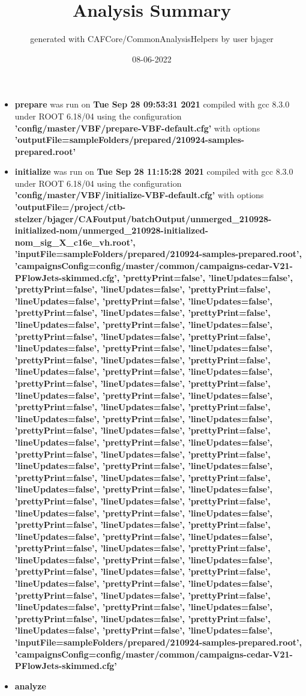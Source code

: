 \documentclass{article}
\title{Analysis Summary}
\author{generated with CAFCore/CommonAnalysisHelpers by user bjager}
\date{08-06-2022}
\begin{document}
\maketitle
\tableofcontents

\begin{itemize}
\item \textbf{prepare} was run on \textbf{Tue Sep 28 09:53:31 2021} compiled with gcc 8.3.0 under ROOT 6.18/04 using the configuration \textbf{'config/master/VBF/prepare-VBF-default.cfg'} with options \textbf{'outputFile=sampleFolders/prepared/210924-samples-prepared.root'} \item \textbf{initialize} was run on \textbf{Tue Sep 28 11:15:28 2021} compiled with gcc 8.3.0 under ROOT 6.18/04 using the configuration \textbf{'config/master/VBF/initialize-VBF-default.cfg'} with options \textbf{'outputFile=/project/ctb-stelzer/bjager/CAFoutput/batchOutput/unmerged\_210928-initialized-nom/unmerged\_210928-initialized-nom\_sig\_X\_c16e\_vh.root', 'inputFile=sampleFolders/prepared/210924-samples-prepared.root', 'campaignsConfig=config/master/common/campaigns-cedar-V21-PFlowJets-skimmed.cfg', 'prettyPrint=false', 'lineUpdates=false', 'prettyPrint=false', 'lineUpdates=false', 'prettyPrint=false', 'lineUpdates=false', 'prettyPrint=false', 'lineUpdates=false', 'prettyPrint=false', 'lineUpdates=false', 'prettyPrint=false', 'lineUpdates=false', 'prettyPrint=false', 'lineUpdates=false', 'prettyPrint=false', 'lineUpdates=false', 'prettyPrint=false', 'lineUpdates=false', 'prettyPrint=false', 'lineUpdates=false', 'prettyPrint=false', 'lineUpdates=false', 'prettyPrint=false', 'lineUpdates=false', 'prettyPrint=false', 'lineUpdates=false', 'prettyPrint=false', 'lineUpdates=false', 'prettyPrint=false', 'lineUpdates=false', 'prettyPrint=false', 'lineUpdates=false', 'prettyPrint=false', 'lineUpdates=false', 'prettyPrint=false', 'lineUpdates=false', 'prettyPrint=false', 'lineUpdates=false', 'prettyPrint=false', 'lineUpdates=false', 'prettyPrint=false', 'lineUpdates=false', 'prettyPrint=false', 'lineUpdates=false', 'prettyPrint=false', 'lineUpdates=false', 'prettyPrint=false', 'lineUpdates=false', 'prettyPrint=false', 'lineUpdates=false', 'prettyPrint=false', 'lineUpdates=false', 'prettyPrint=false', 'lineUpdates=false', 'prettyPrint=false', 'lineUpdates=false', 'prettyPrint=false', 'lineUpdates=false', 'prettyPrint=false', 'lineUpdates=false', 'prettyPrint=false', 'lineUpdates=false', 'prettyPrint=false', 'lineUpdates=false', 'prettyPrint=false', 'lineUpdates=false', 'prettyPrint=false', 'lineUpdates=false', 'prettyPrint=false', 'lineUpdates=false', 'prettyPrint=false', 'lineUpdates=false', 'prettyPrint=false', 'lineUpdates=false', 'prettyPrint=false', 'lineUpdates=false', 'prettyPrint=false', 'lineUpdates=false', 'prettyPrint=false', 'lineUpdates=false', 'prettyPrint=false', 'lineUpdates=false', 'prettyPrint=false', 'lineUpdates=false', 'prettyPrint=false', 'lineUpdates=false', 'prettyPrint=false', 'lineUpdates=false', 'prettyPrint=false', 'lineUpdates=false', 'prettyPrint=false', 'lineUpdates=false', 'inputFile=sampleFolders/prepared/210924-samples-prepared.root', 'campaignsConfig=config/master/common/campaigns-cedar-V21-PFlowJets-skimmed.cfg'} \item \textbf{analyze} 
\end{itemize}
\end{document}

